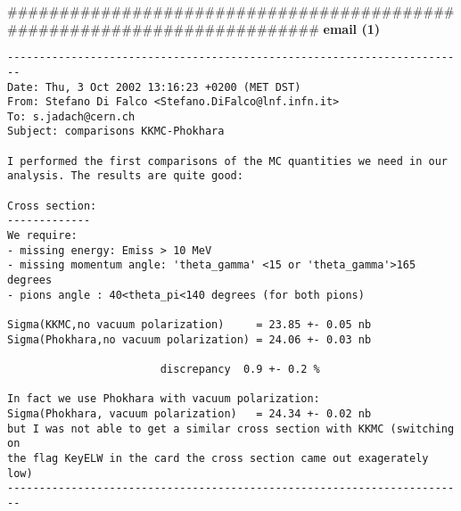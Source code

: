 #########################################################################
{\bf email (1)}
\begin{verbatim}
------------------------------------------------------------------------
Date: Thu, 3 Oct 2002 13:16:23 +0200 (MET DST)
From: Stefano Di Falco <Stefano.DiFalco@lnf.infn.it>
To: s.jadach@cern.ch
Subject: comparisons KKMC-Phokhara

I performed the first comparisons of the MC quantities we need in our
analysis. The results are quite good:

Cross section:
-------------
We require:
- missing energy: Emiss > 10 MeV
- missing momentum angle: 'theta_gamma' <15 or 'theta_gamma'>165 degrees
- pions angle : 40<theta_pi<140 degrees (for both pions)

Sigma(KKMC,no vacuum polarization)     = 23.85 +- 0.05 nb
Sigma(Phokhara,no vacuum polarization) = 24.06 +- 0.03 nb

                        discrepancy  0.9 +- 0.2 %

In fact we use Phokhara with vacuum polarization:
Sigma(Phokhara, vacuum polarization)   = 24.34 +- 0.02 nb
but I was not able to get a similar cross section with KKMC (switching on
the flag KeyELW in the card the cross section came out exagerately low)
------------------------------------------------------------------------
\end{verbatim}
